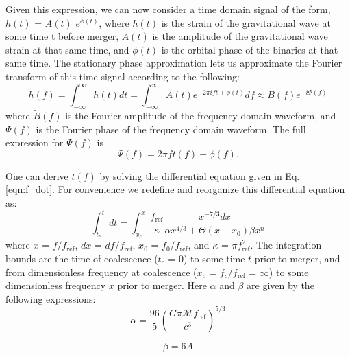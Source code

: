 Given this expression, we can now consider a time domain signal of the form, $h(t)$ = $A(t)$ $e^{\phi(t)}$, where $h(t)$ is the strain of the gravitational wave at some time t before merger, $A(t)$ is the amplitude of the gravitational wave strain at that same time, and $\phi(t)$ is the orbital phase of the binaries at that same time. The stationary phase approximation lets us approximate the Fourier transform of this time signal according to the following:
\begin{equation}\label{eqn:SPA}
\tilde{h}(f) = \int_{-\infty}^{\infty} h(t) dt = \int_{-\infty}^{\infty} A(t) e^{-2\pi i ft + \phi(t)} df \approx \tilde{B}(f) e^{-i\Psi(f)}
\end{equation}
where $\tilde{B}(f)$ is the Fourier amplitude of the frequency domain waveform, and $\Psi(f)$ is the Fourier phase of the frequency domain waveform. The full expression for $\Psi(f)$ is
\begin{equation}\label{eqn:SPA_Phase}
\Psi(f) = 2\pi f t(f) - \phi(f).
\end{equation}

One can derive $t(f)$ by solving the differential equation given in Eq. \ref{eqn:f_dot}. For convenience we redefine and reorganize this differential equation as:
\begin{equation}\label{eqn:unitless_f_dot}
\int_{t_c}^t dt = \int_{x_c}^{x}  \frac{f_{\mathrm{ref}}}{\kappa} \frac{x^{-7/3} dx}{\alpha x^{4/3} +  \Theta(x - x_0) \beta x^n}
\end{equation}
where $x$ = $f / f_{\mathrm{ref}}$, $dx$ = $df / f_{\mathrm{ref}}$, $x_0$ = $f_0 / f_{\mathrm{ref}}$, and $\kappa$ = $\pi f_{\mathrm{ref}}^2$. The integration bounds are the time of coalescence ($t_c$ = 0) to some time $t$ prior to merger, and from dimensionless frequency at coalescence ($x_c$ = $f_c / f_{\mathrm{ref}}$ = $\infty$) to some dimensionless frequency $x$ prior to merger. Here $\alpha$ and $\beta$ are given by the following expressions:
\begin{equation}
\alpha = \frac{96}{5} \left ( \frac{G \pi \mathcal{M} f_{\mathrm{ref}}}{c^3} \right )^{5/3}
\end{equation}

\begin{equation}
\beta = 6 A
\end{equation}

